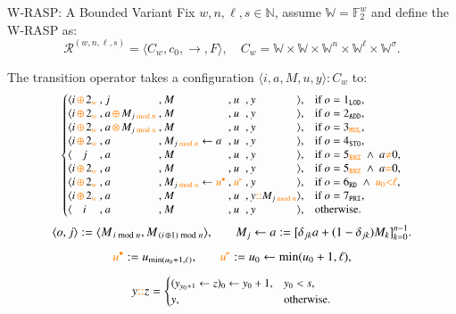 \documentclass{beamer}
\newcommand{\W}{\mathbb W}
\newcommand{\diff}[1]{\textcolor{orange}{#1}}
\begin{document}
\begin{frame}{W-RASP: A Bounded Variant}
  Fix \(w,n,\ell,s\in\mathbb N\), assume \(\W=\mathbb F_2^w\) and define the W-RASP as:
  \[
    \mathcal R^{(w,n,\ell,s)}=\langle C_w,c_0,\to,F\rangle,
    \quad
    C_w=\W\times\W\times\W^n\times\W^{\ell}\times\W^{\sigma}.
  \]

  The transition operator takes a configuration $\langle i,a,M,u,y\rangle: C_w$ to:
  \[\small
  \left\{
    \begin{array}{@{}c@{}c@{\:,\:}l@{\:,\:}l@{\:,\:}l@{\:,\:}l@{}c@{\quad}l@{}}
      \langle & i\,\diff{\oplus}\, 2\diff{_w} & j                         & M & u & y                         & \rangle, & \text{if } o=1_{\texttt{LOD}},\\
      \langle & i\,\diff{\oplus}\, 2\diff{_w} & a\,\diff{\oplus}\, M_{j\diff{\bmod n}}       & M & u & y                         & \rangle, & \text{if } o=2_{\texttt{ADD}},\\
      \langle & i\,\diff{\oplus}\, 2\diff{_w} & a\,\diff{\otimes}\, M_{j\diff{\bmod n}}      & M & u & y                         & \rangle, & \text{if } o=3_{\diff{\texttt{MUL}}},\\
      \langle & i\,\diff{\oplus}\, 2\diff{_w} & a                         & M_{j\diff{\bmod n}}\gets a & u & y        & \rangle, & \text{if } o=4_{\texttt{STO}},\\
      \langle & j                             & a                         & M & u & y                         & \rangle, & \text{if } o=5_{\diff{\texttt{BNZ}}}\ \wedge\ a \diff{\neq} 0,\\
      \langle & i\,\diff{\oplus}\, 2\diff{_w} & a                         & M & u & y                         & \rangle, & \text{if } o=5_{\diff{\texttt{BNZ}}}\ \wedge\ a \diff{=} 0,\\
      \langle & i\,\diff{\oplus}\, 2\diff{_w} & a                         & M_{j\diff{\bmod n}}\gets \diff{u^\bullet} & \diff{u^\triangleright} & y & \rangle, & \text{if } o=6_{\texttt{RD}}\ \wedge\ \diff{u_0}\diff{<}\diff{\ell},\\
      \langle & i\,\diff{\oplus}\, 2\diff{_w} & a                         & M & u & y \diff{::} M_{j\diff{\bmod n}}          & \rangle, & \text{if } o=7_{\texttt{PRI}},\\
      \langle & i                             & a                         & M & u & y                         & \rangle, & \text{otherwise.}
    \end{array}
  \right.
  \]
  \[\small
    \langle o,j\rangle:=\big\langle M_{\,i\bmod n},M_{\,(i\,\oplus 1)\bmod n}\big\rangle,
    \qquad
    M_j\gets a := \big[\delta_{jk}a+(1-\delta_{jk})M_k\big]_{k=0}^{n-1}.
  \]
  \[\small
    \diff{u^\bullet}:=u_{\min(u_0+1,\ell)},\qquad
    \diff{u^\triangleright}:=u_0\gets\min(u_0+1,\ell),
  \]
  \[\small
    y\diff{::}z=
    \begin{cases}
      (y_{y_0+1}\gets z)_0\gets y_0+1,&y_0<s,\\
      y,&\text{otherwise.}
    \end{cases}
  \]

\end{frame}
\end{document}
